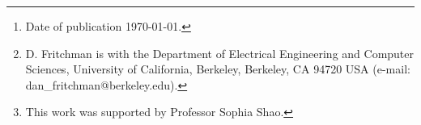 \documentclass[twoside,9pt,journal,letterpage]{IEEEtran}
\title{\titlestr}
\author{
	Dan Fritchman, \IEEEmembership{Member, IEEE} 
	\thanks{Date of publication \monthdayyeardate\today.}
	\thanks{D. Fritchman is with the Department of Electrical Engineering and Computer Sciences, University of California, Berkeley, Berkeley, CA 94720 USA (e-mail: dan\_fritchman@berkeley.edu).}
	\thanks{This work was supported by Professor Sophia Shao.}
}
\begin{document}
\maketitle
\IEEEpeerreviewmaketitle

\begin{markdown}




\end{markdown}



\end{document}
